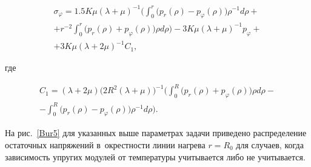\begin{multline}

\sigma _{\varphi } =

1.5K\mu (\lambda +\mu )^{-1} 

\biggl(

\int _{0}^{r}  \bigl(p_{r} (\rho )-p_{\varphi } (\rho )\bigr) \rho ^{-1} d\rho  +

\\ 

+r^{-2} \int _{0}^{r} \bigl(p_{r} (\rho )+p_{\varphi } (\rho )\bigr) \rho  d\rho  \biggr) 

-

3K\mu (\lambda +\mu )^{-1} p_{\varphi } +\\ +3K\mu (\lambda +2\mu )^{-1} C_{1} ,

\end{multline}

где

\begin{multline}

C_{1} = (\lambda +2\mu ) \bigl(2R^{2} (\lambda +\mu )\bigr)^{-1}

\biggl( 

\int _{0}^{R} \bigl(p_{r} (\rho )+p_{\varphi } (\rho )\bigr) \rho  d\rho  - 

\\ 

-


\int _{0}^{R} \bigl(p_{r} (\rho )-p_{\varphi } (\rho )\bigr) \rho ^{-1}  d\rho \biggr).

\end{multline}



На рис.~\ref{Bur5} для указанных выше параметрах задачи приведено распределение остаточных напряжений в~окрестности линии нагрева $r=R_{0} $ для случаев, когда зависимость упругих модулей от температуры учитывается либо не учитывается. 





